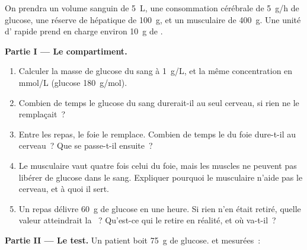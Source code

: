 \begin{problem}
\label{pb:g12:glucose-and-diabetes:1}
On prendra un volume sanguin de \qty{5}{L}, une consommation cérébrale
de \qty{5}{g/h} de glucose, une réserve de  hépatique de
\qty{100}{g}, et un  musculaire de \qty{400}{g}. Une unité
d' rapide prend en charge environ \qty{10}{g} de .

\medskip
\noindent\textbf{Partie I --- Le compartiment.}
\begin{enumerate}
  \item Calculer la masse de glucose du sang à \qty{1}{g/L}, et la
        même concentration en \unit{mmol/L} (glucose
        \qty{180}{g/mol}).
  \item Combien de temps le glucose du sang durerait-il au seul
        cerveau, si rien ne le remplaçait~?
  \item Entre les repas, le foie le remplace. Combien de temps le
         du foie dure-t-il au cerveau~? Que se passe-t-il
        ensuite~?
  \item Le  musculaire vaut quatre fois celui du foie, mais
        les muscles ne peuvent pas libérer de glucose dans le sang.
        Expliquer pourquoi le  musculaire n'aide pas le
        cerveau, et à quoi il sert.
  \item Un repas délivre \qty{60}{g} de glucose en une heure. Si rien
        n'en était retiré, quelle valeur atteindrait la ~?
        Qu'est-ce qui le retire en réalité, et où va-t-il~?
\end{enumerate}

\medskip
\noindent\textbf{Partie II --- Le test.}
Un patient boit \qty{75}{g} de glucose.  et 
mesurées~:


\end{problem}
